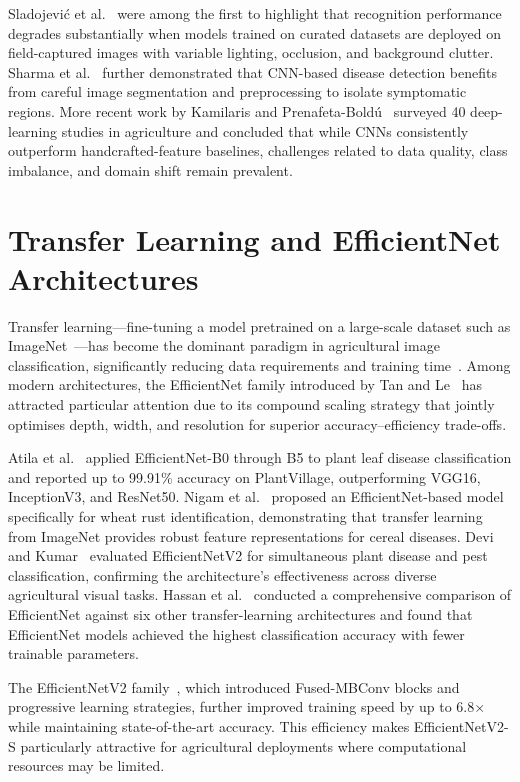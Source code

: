 \documentclass[12pt,a4paper]{report}
\begin{document}
Sladojevi\'{c} et al.~\cite{b6} were among the first to highlight that recognition performance degrades substantially when models trained on curated datasets are deployed on field-captured images with variable lighting, occlusion, and background clutter. Sharma et al.~\cite{b21} further demonstrated that CNN-based disease detection benefits from careful image segmentation and preprocessing to isolate symptomatic regions. More recent work by Kamilaris and Prenafeta-Bold\'{u}~\cite{b9} surveyed 40 deep-learning studies in agriculture and concluded that while CNNs consistently outperform handcrafted-feature baselines, challenges related to data quality, class imbalance, and domain shift remain prevalent.

\section{Transfer Learning and EfficientNet Architectures}
Transfer learning---fine-tuning a model pretrained on a large-scale dataset such as ImageNet~\cite{b15}---has become the dominant paradigm in agricultural image classification, significantly reducing data requirements and training time~\cite{b17}. Among modern architectures, the EfficientNet family introduced by Tan and Le~\cite{b1} has attracted particular attention due to its compound scaling strategy that jointly optimises depth, width, and resolution for superior accuracy--efficiency trade-offs.

Atila et al.~\cite{b4} applied EfficientNet-B0 through B5 to plant leaf disease classification and reported up to 99.91\% accuracy on PlantVillage, outperforming VGG16, InceptionV3, and ResNet50. Nigam et al.~\cite{b12} proposed an EfficientNet-based model specifically for wheat rust identification, demonstrating that transfer learning from ImageNet provides robust feature representations for cereal diseases. Devi and Kumar~\cite{b13} evaluated EfficientNetV2 for simultaneous plant disease and pest classification, confirming the architecture's effectiveness across diverse agricultural visual tasks. Hassan et al.~\cite{b14} conducted a comprehensive comparison of EfficientNet against six other transfer-learning architectures and found that EfficientNet models achieved the highest classification accuracy with fewer trainable parameters.

The EfficientNetV2 family~\cite{b1}, which introduced Fused-MBConv blocks and progressive learning strategies, further improved training speed by up to 6.8$\times$ while maintaining state-of-the-art accuracy. This efficiency makes EfficientNetV2-S particularly attractive for agricultural deployments where computational resources may be limited.
\end{document}

